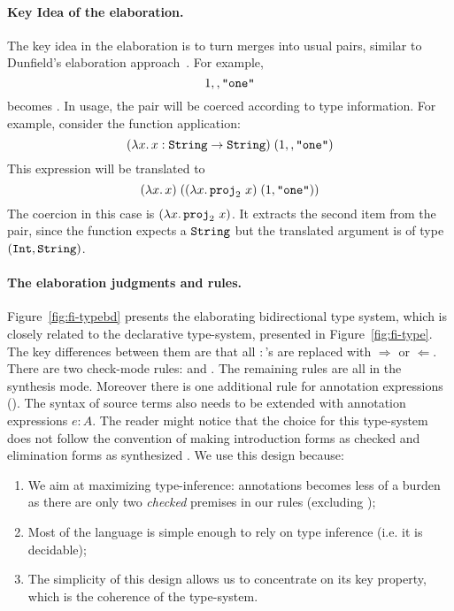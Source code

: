 \paragraph{Key Idea of the elaboration.}
The key idea in the elaboration is to turn merges into usual pairs, similar to Dunfield's
elaboration approach~\cite{dunfield2014elaborating}.
For example, \[ 1 \mergeop \code{"one"} \] becomes 
{}. In usage, the pair will be coerced according to type
information. For example, consider the function application: 
\[ \app {(\lamty x {\code{String}} x : \code{String} \to \code{String})} {(1 \mergeop \code{"one"})} \] 
This expression will be translated to \[ \app
{(\lamty x {\code{String}} x)} {(\app {(\lamty x {\pair {\code{Int}} {\code{String}}} {\proj 2~x})}
{\pair 1 {\code{"one"}}})} \] The coercion in this case is $(\lamty x {\pair
{\code{Int}} {\code{String}}} {\proj 2~x})$. It extracts the second item from the pair, since
the function expects a $\code{String}$ but the translated argument is of type $\pair
{\code{Int}} {\code{String}}$.

\paragraph{The elaboration judgments and rules.}
Figure~\ref{fig:fi-typebd} presents the elaborating bidirectional type
system, which is closely related to the declarative type-system, presented
in Figure~\ref{fig:fi-type}. 
The key differences between them are
that all $:$'s are replaced with $\Rightarrow$ or $\Leftarrow$. There
are two check-mode rules:  and
. The remaining rules are all in the synthesis
mode. Moreover there is one additional rule for annotation expressions
(). The syntax of source terms also needs to be
extended with annotation expressions $e : A$. 
The reader might notice that the choice for this type-system does not
follow the convention of making introduction forms as checked
and elimination forms as synthesized \cite{davies2000intersection,Dunfield04tri}.
We use this design because:

\begin{enumerate}
\item We aim at maximizing type-inference: annotations becomes 
less of a burden as there are only two \emph{checked} premises in our rules (excluding );
\item Most of the language is simple enough to rely on type inference (i.e. it is decidable);
\item The simplicity of this design allows us to concentrate on its key property, 
which is the coherence of the type-system.
\end{enumerate}


